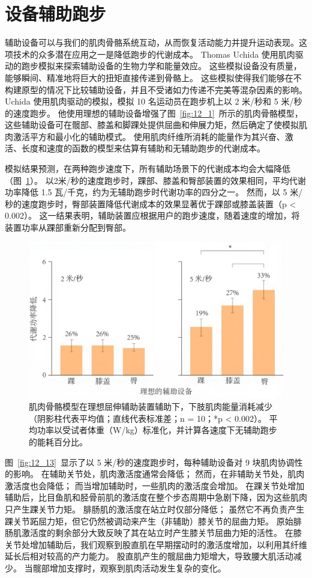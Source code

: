 \section{设备辅助跑步}

辅助设备可以与我们的肌肉骨骼系统互动，从而恢复活动能力并提升运动表现。这项技术的众多潜在应用之一是降低跑步的代谢成本。
Thomas Uchida 使用肌肉驱动的跑步模拟来探索辅助设备的生物力学和能量效应\cite{uchida2016simulating}。
这些模拟设备没有质量，能够瞬间、精准地将巨大的扭矩直接传递到骨骼上。
这些模拟使得我们能够在不构建原型的情况下比较辅助设备，并且不受诸如力传递不完美等混杂因素的影响。
Uchida 使用肌肉驱动的模拟，模拟 10 名运动员在跑步机上以 2 米/秒和 5 米/秒的速度跑步。
他使用理想的辅助设备增强了图~\ref{fig:12_1}~所示的肌肉骨骼模型，这些辅助设备可在髋部、膝盖和脚踝处提供屈曲和伸展力矩，然后确定了使模拟肌肉激活平方和最小化的辅助模式。
使用肌肉纤维所消耗的能量作为其兴奋、激活、长度和速度的函数的模型来估算有辅助和无辅助跑步的代谢成本\cite{umberger2003model,uchida2016simulating}。


模拟结果预测，在两种跑步速度下，所有辅助场景下的代谢成本均会大幅降低（图~\ref{fig:12_12}）。
以2米/秒的速度跑步时，踝部、膝盖和臀部装置的效果相同，平均代谢功率降低 1.5 瓦/千克，约为无辅助跑步时代谢功率的四分之一。
然而，以 5 米/秒的速度跑步时，臀部装置降低代谢成本的效果显著优于踝部或膝盖装置（p < 0.002）。
这一结果表明，辅助装置应根据用户的跑步速度，随着速度的增加，将装置功率从踝部重新分配到臀部。

\begin{figure}[!htb]
	\centering
	\includegraphics[width=0.75\linewidth]{chap12/12_12}
	\caption{肌肉骨骼模型在理想屈伸辅助装置辅助下，下肢肌肉能量消耗减少（阴影柱代表平均值；直线代表标准差；n = 10；*p < 0.002）。
		平均功率以受试者体重（W/kg）标准化，并计算各速度下无辅助跑步的能耗百分比\cite{uchida2016simulating}。 \label{fig:12_12}}
\end{figure}


图~\ref{fig:12_13}~显示了以 5 米/秒的速度跑步时，每种辅助设备对 9 块肌肉协调性的影响。
在辅助关节处，肌肉激活度通常会降低；
然而，在非辅助关节处，肌肉激活度也会降低；
而当增加辅助时，一些肌肉的激活度会增加。
在踝关节处增加辅助后，比目鱼肌和胫骨前肌的激活度在整个步态周期中急剧下降，因为这些肌肉只产生踝关节力矩。
腓肠肌的激活度在站立时仅部分降低；
虽然它不再负责产生踝关节跖屈力矩，但它仍然被调动来产生（非辅助）膝关节的屈曲力矩。
原始腓肠肌激活度的剩余部分大致反映了其在站立时产生膝关节屈曲力矩的活性。
在膝关节处增加辅助后，我们观察到股直肌在早期摆动时的激活度增加，以利用其纤维延长后相对较高的产力能力。
股直肌产生的髋屈曲力矩增大，导致腰大肌活动减少。
当髋部增加支撑时，观察到肌肉活动发生复杂的变化。


